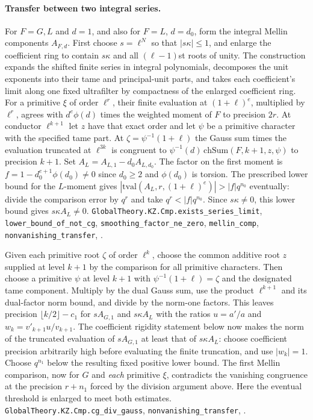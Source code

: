 \paragraph{Transfer between two integral series.}
For $F=G,L$ and $d=1$, and also for $F=L$, $d=d_0$, form the integral
Mellin components $A_{F,d}$. First choose $s=\ell^N$ so that $|s\kappa|\le1$, and enlarge the
coefficient ring to contain $s\kappa$ and all $(\ell-1)$st roots of unity.
The construction expands the shifted finite series in integral polynomials,
decomposes the unit exponents into their tame and principal-unit parts,
and takes each coefficient's limit along one fixed ultrafilter by compactness
of the enlarged coefficient ring. For a primitive
$\xi$ of order $\ell^r$, their finite evaluation at $(1+\ell)^e$, multiplied
by $\ell^r$, agrees with $d^e\phi(d)$ times the weighted moment of $F$ to precision
$2r$. At conductor $\ell^{k+1}$ let $z$ have that exact order and let $\psi$ be a
primitive character with the specified tame part. At
$\zeta=\psi^{-1}(1+\ell)$ the Gauss sum times the evaluation truncated
at $\ell^{3k}$ is congruent to $\psi^{-1}(d)\,\mathrm{chSum}(F,k+1,z,\psi)$
to precision $k+1$.
Set $A_L=A_{L,1}-d_0 A_{L,d_0}$. The factor on the first moment is
$f=1-d_0^{e+1}\phi(d_0)\ne0$ since $d_0\ge2$ and $\phi(d_0)$ is torsion.
The prescribed lower bound for the $L$-moment gives
$|\mathrm{tval}(A_L,r,(1+\ell)^e)|>|f|q^{n_0}$ eventually: divide the
comparison error by $q^r$ and take $q^r<|f|q^{n_0}$.
Since $s\kappa\ne0$, this lower bound gives $s\kappa A_L\ne0$.
{\footnotesize\nolinkurl{GlobalTheory.KZ.Cmp.exists_series_limit},
\nolinkurl{lower_bound_of_not_cg}, \nolinkurl{smoothing_factor_ne_zero},
\nolinkurl{mellin_comp}, \nolinkurl{nonvanishing_transfer},
.}

Given each primitive root $\zeta$ of order $\ell^k$, choose the common
additive root $z$ supplied at level $k+1$ by the comparison for all primitive
characters. Then choose a primitive $\psi$ at level $k+1$ with
$\psi^{-1}(1+\ell)=\zeta$ and the designated tame component.
Multiply by the dual Gauss sum, use the product $\ell^{k+1}$ and its
dual-factor norm bound, and divide by the norm-one factors. This leaves
precision $\lfloor k/2\rfloor-c_1$ for $s A_{G,1}$ and
$s\kappa A_L$ with the ratios $u=a'/a$ and
$w_k=v'_{k+1}u/v_{k+1}$. The coefficient rigidity statement below now
makes the norm of the truncated evaluation of $s A_{G,1}$ at least that
of $s\kappa A_L$: choose coefficient precision arbitrarily high before
evaluating the finite truncation, and use $|w_k|=1$. Choose $q^{n_1}$
below the resulting fixed positive lower bound. The first Mellin comparison,
now for $G$ and \emph{each} primitive $\xi$, contradicts the vanishing
congruence at the precision $r+n_1$ forced by the division argument above. Here the eventual
threshold is enlarged to meet both estimates.
{\footnotesize\nolinkurl{GlobalTheory.KZ.Cmp.cg_div_gauss},
\nolinkurl{nonvanishing_transfer},
.}

